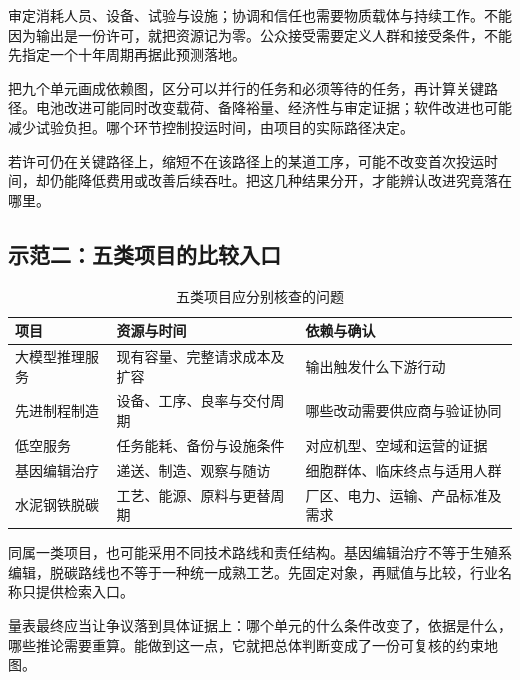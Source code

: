 审定消耗人员、设备、试验与设施；协调和信任也需要物质载体与持续工作。不能因为输出是一份许可，就把资源记为零。公众接受需要定义人群和接受条件，不能先指定一个十年周期再据此预测落地。

把九个单元画成依赖图，区分可以并行的任务和必须等待的任务，再计算关键路径。电池改进可能同时改变载荷、备降裕量、经济性与审定证据；软件改进也可能减少试验负担。哪个环节控制投运时间，由项目的实际路径决定。

若许可仍在关键路径上，缩短不在该路径上的某道工序，可能不改变首次投运时间，却仍能降低费用或改善后续吞吐。把这几种结果分开，才能辨认改进究竟落在哪里。

\subsection{示范二：五类项目的比较入口}

\begin{table}[ht]
\centering
\caption{五类项目应分别核查的问题}
\label{tab:scale-five}
{\small
\begin{tabularx}{\textwidth}{@{}p{3.1cm}XX@{}}
\toprule
项目 & 资源与时间 & 依赖与确认\\
\midrule
大模型推理服务 & 现有容量、完整请求成本及扩容 & 输出触发什么下游行动\\
先进制程制造 & 设备、工序、良率与交付周期 & 哪些改动需要供应商与验证协同\\
低空服务 & 任务能耗、备份与设施条件 & 对应机型、空域和运营的证据\\
基因编辑治疗 & 递送、制造、观察与随访 & 细胞群体、临床终点与适用人群\\
水泥钢铁脱碳 & 工艺、能源、原料与更替周期 & 厂区、电力、运输、产品标准及需求\\
\bottomrule
\end{tabularx}}
\end{table}

同属一类项目，也可能采用不同技术路线和责任结构。基因编辑治疗不等于生殖系编辑，脱碳路线也不等于一种统一成熟工艺。先固定对象，再赋值与比较，行业名称只提供检索入口。

量表最终应当让争议落到具体证据上：哪个单元的什么条件改变了，依据是什么，哪些推论需要重算。能做到这一点，它就把总体判断变成了一份可复核的约束地图。

